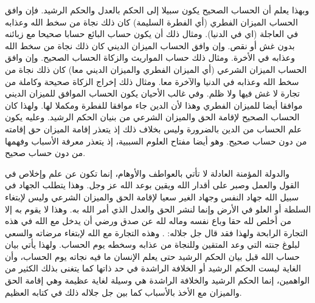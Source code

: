 وبهذا يعلم أن الحساب الصحيح يكون سبيلا إلى الحكم بالعدل والحكم الرشيد. فإن وافق الحساب الميزان الفطري (أي الفطرة السليمة) كان ذلك نجاة من سخط الله وعذابه في العاجلة (اي في الدنيا). ومثال ذلك أن يكون حساب البائع حسابا صحيحا مع زبائنه بدون غش أو نقص. وإن وافق الحساب الميزان الديني كان ذلك نجاة من سخط الله وعذابه في الأخرة. ومثال ذلك حساب المواريث والزكاة الحساب الصحيح. وإن وافق الحساب الميزان الشرعي (أي الميزان الفطري والميزان الديني معا) كان ذلك نجاة من سخط الله وعذابه في الدنيا والآخرة معا. ومثال ذلك إخراج الزكاة صحيحة وكاملة من تجارة لا غش فيها ولا ظلم. وفي غالب الأحيان يكون الحساب الموافق للميزان الديني موافقا أيضا للميزان الفطري وهذا لأن الدين جاء موافقا للفطرة ومكملا لها. ولهذا كان الحساب الصحيح لإقامة الحق والميزان الشرعي من بنيان الحكم الرشيد. وعليه يكون علم الحساب من الدين بالضرورة وليس بخلاف ذلك إذ يتعذر إقامة الميزان حق إقامته من دون حساب صحيح. وهو أيضا مفتاح العلوم السببية، إذ يتعذر معرفة الأسباب وفهمها من دون حساب صحيح.

والدولة المؤمنة العادلة لا تأتي بالعواطف والأوهام، إنما تكون عن علم وإخلاص في القول والعمل وصبر على أقدار الله ويقين بوعد الله عز وجل. وهذا يتطلب الجهاد في سبيل الله جهاد النفس وجهاد الغير سعيا لإقامة الحق والميزان الشرعي وليس لإبتغاء السلطة أو العلو في الأرض وإنما لنشر الحق والعدل الذي أمر الله به. وهذا لا يقوم به إلا من أخلص لله حقا وباع نفسه وماله لله عن صدق ورضي أن يدخل مع الله في هذه التجارة الرابحة ولهذا فقد قال جل جلاله: \quranayah*[9][111]{\footnotesize \surahname*[9]}. وهذه التجارة مع الله لإبتغاء مرضاته والسعي لبلوغ جنته التي وعد المتقين وللنجاة من عذابه وسخطه يوم الحساب. ولهذا يأتي بيان حساب الله قبل بيان الحكم الرشيد حتى يعلم الإنسان ما فيه نجاته يوم الحساب، وأن الغاية ليست الحكم الرشيد أو الخلافة الراشدة في حد ذاتها كما يتغنى بذلك الكثير من الواهمين، إنما الحكم الرشيد والخلافة الراشدة هي وسيلة لغاية عظيمة وهي إقامة الحق والميزان مع الأخذ بالأسباب كما بين جل جلاله ذلك في كتابه العظيم.

